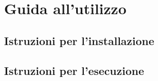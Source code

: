 \chapter{Guida all'utilizzo}




\section{Istruzioni per l'installazione}




\section{Istruzioni per l'esecuzione}
